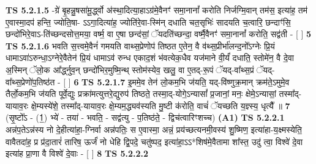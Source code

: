 \documentclass[17pt]{extarticle}
\begin{document}
                                \textbf{ TS 5.2.1.5} \newline
                  -ग्रे॑ बृ॒हन्नु॒षसा॑मू॒र्द्ध्वो अ॑स्था॒दित्या॒हाऽग्र॑मे॒वैनꣳ॑ समा॒नानां᳚ करोति निर्जग्मि॒वान् तम॑स॒ इत्या॑ह॒ तम॑ ए॒वास्मा॒दप॑ हन्ति॒ ज्योति॒षा- ऽऽगा॒दित्या॑ह॒ ज्योति॑रे॒वा-स्मि॑न् दधाति चत॒सृभिः॑ सादयति च॒त्वारि॒ छन्दाꣳ॑सि॒ छन्दो॑भिरे॒वाऽ-ति॑च्छन्दसोत्त॒मया॒ वर्ष्म॒ वा ए॒षा छन्द॑सां॒ ॅयदति॑च्छन्दा॒ वर्ष्मै॒वैनꣳ॑ समा॒नानां᳚ करोति॒ सद्व॑ती - [  ] \textbf{  5} \newline
                  \newline
                                \textbf{ TS 5.2.1.6} \newline
                  भवति स॒त्त्वमे॒वैनं॑ गमयति वाथ्स॒प्रेणोप॑ तिष्ठत ए॒तेन॒ वै व॑थ्स॒प्रीर्भा॑लन्द॒नो᳚ऽग्नेः प्रि॒यं धामाऽवा॑ऽरुन्धा॒ऽग्नेरे॒वैतेन॑ प्रि॒यं धामाऽव॑ रुन्ध एकाद॒शं भ॑वत्येक॒धैव यज॑माने वी॒र्यं॑ दधाति॒ स्तोमे॑न॒ वै दे॒वा अ॒स्मिन् ॅलो॒क आ᳚र्द्ध्नुव॒न् छन्दो॑भिर॒मुष्मि॒न्थ् स्तोम॑स्येव॒ खलु॒ वा ए॒तद्-रू॒पं ॅयद्-वा᳚थ्स॒प्रं ॅयद्-वा᳚थ्स॒प्रेणो॑प॒तिष्ठ॑त - [  ] \textbf{  6} \newline
                  \newline
                                \textbf{ TS 5.2.1.7} \newline
                  इ॒ममे॒व तेन॑ लो॒कम॒भि ज॑यति॒ यद्-वि॑ष्णुक्र॒मान् क्रम॑ते॒ऽमुमे॒व तैर्लो॒कम॒भि ज॑यति पूर्वे॒द्युः प्रक्रा॑मत्युत्तरे॒द्युरुप॑ तिष्ठते॒ तस्मा॒द्-योगे॒ऽन्यासां᳚ प्र॒जानां॒ मनः॒ क्षेमे॒ऽन्यासां॒ तस्मा᳚द्-यायाव॒रः क्षे॒म्यस्ये॑शे॒ तस्मा᳚द्-यायाव॒रः क्षे॒म्यम॒द्ध्यव॑स्यति मु॒ष्टी क॑रोति॒ वाचं॑ ॅयच्छति य॒ज्ञ्स्य॒ धृत्यै᳚ ॥ \textbf{  7 } \newline
                  \newline
                      (सृ॒ष्टो᳚ऽ - (1॒) भ्ये॑ - तया॑ - भवति॒ - सद्व॑त्यु - प॒तिष्ठ॑ते॒ - द्विच॑त्वारिꣳशच्च)  \textbf{(A1)} \newline \newline
                                        \textbf{ TS 5.2.2.1} \newline
                  अन्न॑प॒तेऽन्न॑स्य नो दे॒हीत्या॑हा॒-ग्निर्वा अन्न॑पतिः॒ स ए॒वास्मा॒ अन्नं॒ प्रय॑च्छत्यनमी॒वस्य॑ शु॒ष्मिण॒ इत्या॑हा-य॒क्ष्मस्येति॒ वावैतदा॑ह॒ प्र प्र॑दा॒तारं॑ तारिष॒ ऊर्जं॑ नो धेहि द्वि॒पदे॒ चतु॑ष्पद॒ इत्या॑हा॒ऽऽ*शिष॑मे॒वैतामा शा᳚स्त॒ उदु॑ त्वा॒ विश्वे॑ दे॒वा इत्या॑ह प्रा॒णा वै विश्वे॑ दे॒वाः - [  ] \textbf{  8} \newline
                  \newline
                                \textbf{ TS 5.2.2.2} \newline
\end{document}
